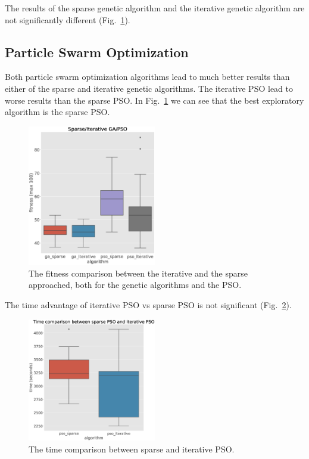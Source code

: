 \documentclass[conference]{IEEEtran}
\begin{document}
    The results of the sparse genetic algorithm and the iterative genetic algorithm
    are not significantly different (Fig.~\ref{fig:overview}).

    \subsection{Particle Swarm Optimization}\label{subsec:sparse-particle-swarm-optimization}
    Both particle swarm optimization algorithms lead to much better results than either of the
    sparse and iterative genetic algorithms.
    The iterative PSO lead to worse results than the sparse PSO\@.
    In Fig.~\ref{fig:overview} we can see that the best exploratory algorithm is the sparse PSO\@.
    \begin{figure}[!h]
        \centering
        \includegraphics[width=0.5\textwidth]{old_images/overview.eps}
        \caption{The fitness comparison between the iterative and the sparse approached,
        both for the genetic algorithms and the PSO. }
        \label{fig:overview}
    \end{figure}

    The time advantage of iterative PSO vs sparse PSO is not significant (Fig.~\ref{fig:pso_sparse_vs_iterative_time}).
    \begin{figure}[!h]
        \centering
        \includegraphics[width=0.5\textwidth]{old_images/pso_sparse_vs_iterative_time.eps}
        \caption{The time comparison between sparse and iterative PSO.}
        \label{fig:pso_sparse_vs_iterative_time}
    \end{figure}
\end{document}
